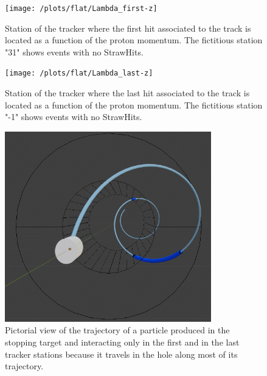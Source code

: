 \documentclass[12pt,a4paper,openright, oneside, titlepage]{book} %
\begin{document}
\begin{figure}[h!]
\centering
\texttt{[image: /plots/flat/Lambda\_first-z]}
\caption[Station of first StrawHit]{Station of the tracker where the first hit associated to the track is located 
as a function of the proton momentum. The fictitious station "31" shows events with no StrawHits.}
\label{_Lambda_first-z}
\end{figure}

\begin{figure}[!htb]
\centering
\texttt{[image: /plots/flat/Lambda\_last-z]}
\caption[Station of last StrawHit]{Station of the tracker where the last hit associated to the track is located 
as a function of the proton momentum. The fictitious station "-1" shows events with no StrawHits.}
\label{_Lambda_last-z}
\end{figure}

\begin{figure}[!htb]
\centering
\includegraphics[width =0.8\textwidth, keepaspectratio]{Blender_Tracker_4}
\caption[Pictorial view of the trajectory of a particle traveling in the bore]
{Pictorial view of the trajectory of a particle produced in the stopping target and interacting only 
in the first and in the last tracker stations because it travels in the hole along most
of its trajectory.}
\label{_blender}
\end{figure}
\end{document}

